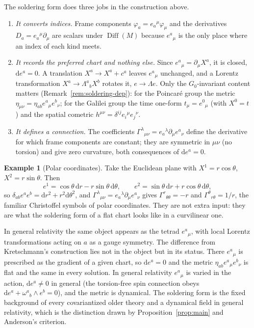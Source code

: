 \documentclass[11pt,a4paper,openany]{book}
\theoremstyle{definition}
\newtheorem{example}{Example}[chapter]
\theoremstyle{plain}
\theoremstyle{remark}
\newcommand{\dd}{\mathrm{d}}
\DeclareMathOperator{\Diff}{Diff}
\begin{document}
The soldering form does three jobs in the construction above.
\begin{enumerate}[leftmargin=1.8em,itemsep=3pt,label=\textbf{\arabic*.}]
\item \emph{It converts indices.} Frame components $\varphi_a=e_a{}^\mu\varphi_\mu$
  and the derivatives $D_a=e_a{}^\mu\partial_\mu$ are scalars under
  $\Diff(M)$ because $e^a{}_\mu$ is the only place where an index of each kind
  meets.
\item \emph{It records the preferred chart and nothing else.} Since
  $e^a{}_\mu=\partial_\mu X^a$, it is closed, $\dd e^a=0$. A translation
  $X^a\to X^a+c^a$ leaves $e^a{}_\mu$ unchanged, and a Lorentz transformation
  $X^a\to\Lambda^a{}_bX^b$ rotates it, $e\to\Lambda e$. Only the
  $G_0$-invariant content matters (Remark~\ref{rem:soldering-dep}): for the
  Poincar\'e group the metric $\eta_{\mu\nu}=\eta_{ab}e^a{}_\mu e^b{}_\nu$; for
  the Galilei group the time one-form $t_\mu=e^0{}_\mu$ (with $X^0=t$) and the
  spatial cometric $h^{\mu\nu}=\delta^{ij}e_i{}^\mu e_j{}^\nu$.
\item \emph{It defines a connection.} The coefficients
  $\Gamma^\lambda{}_{\mu\nu}=e_a{}^\lambda\partial_\mu e^a{}_\nu$ define the
  derivative for which frame components are constant; they are symmetric in
  $\mu\nu$ (no torsion) and give zero curvature, both consequences of
  $\dd e^a=0$.
\end{enumerate}

\begin{example}[Polar coordinates]\label{ex:polar}
Take the Euclidean plane with $X^1=r\cos\theta$, $X^2=r\sin\theta$. Then
\begin{equation}
  e^1=\cos\theta\,\dd r-r\sin\theta\,\dd\theta,\qquad
  e^2=\sin\theta\,\dd r+r\cos\theta\,\dd\theta,
\end{equation}
so $\delta_{ab}e^a e^b=\dd r^2+r^2\dd\theta^2$, and
$\Gamma^\lambda{}_{\mu\nu}=e_a{}^\lambda\partial_\mu e^a{}_\nu$ gives
$\Gamma^r{}_{\theta\theta}=-r$ and $\Gamma^\theta{}_{r\theta}=1/r$, the familiar
Christoffel symbols of polar coordinates. They are not extra input: they are
what the soldering form of a flat chart looks like in a curvilinear one.
\end{example}

In general relativity the same object appears as the tetrad $e^a{}_\mu$, with
local Lorentz transformations acting on $a$ as a gauge symmetry. The
difference from Kretschmann's construction lies not in the object but in its
status. There $e^a{}_\mu$ is prescribed as the gradient of a given chart, so
$\dd e^a=0$ and the metric $\eta_{ab}e^a{}_\mu e^b{}_\nu$ is flat and the same
in every solution. In general relativity $e^a{}_\mu$ is varied in the action,
$\dd e^a\neq0$ in general (the torsion-free spin connection obeys
$\dd e^a+\omega^a{}_b\wedge e^b=0$), and the metric is dynamical. The
soldering form is the fixed background of every covariantized older theory and
a dynamical field in general relativity, which is the distinction drawn by
Proposition~\ref{prop:main} and Anderson's criterion.
\end{document}
